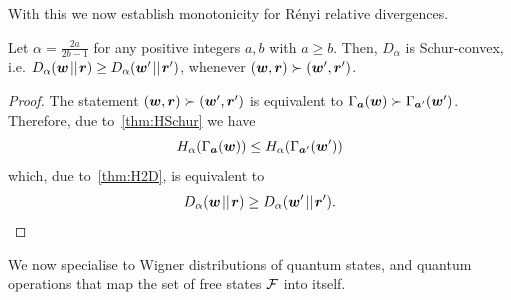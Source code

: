 \documentclass[pra,
aps,
twocolumn,
superscriptaddress,
groupedaddress,
nofootinbib,
reprint
]{revtex4-1}
\begin{document}
With this we now establish monotonicity for R\'{e}nyi relative divergences.
\begin{theorem}\label{thm:DSchur}
	Let $\alpha = \frac{2a}{2b-1}$ for any positive integers $a,b$ with $a \geq b$. 
	Then, $D_\alpha$ is Schur-convex, i.e. $D_\alpha(\boldsymbol{w} \hspace{1pt}||\hspace{1pt} \boldsymbol{r}) \geq D_\alpha(\boldsymbol{w}' \hspace{1pt}||\hspace{1pt} \boldsymbol{r}')$, whenever $(\boldsymbol{w}, \boldsymbol{r}) \succ (\boldsymbol{w}', \boldsymbol{r}')$.
\end{theorem}
\begin{proof}
	The statement $(\boldsymbol{w}, \boldsymbol{r}) \succ (\boldsymbol{w}', \boldsymbol{r}')$ is equivalent to $\Gamma_{\bm{a}}(\boldsymbol{w}) \succ \Gamma_{\bm{a}'}(\boldsymbol{w}')$.
	Therefore, due to~\cref{thm:HSchur} we have
	\begin{equation}
		H_\alpha(\Gamma_{\bm{a}}(\boldsymbol{w})) \leq H_\alpha(\Gamma_{\bm{a}'}(\boldsymbol{w}'))
	\end{equation}
	which, due to~\cref{thm:H2D}, is equivalent to
	\begin{equation}
		D_\alpha(\boldsymbol{w} \hspace{1pt}||\hspace{1pt} \boldsymbol{r}) \geq D_\alpha(\boldsymbol{w}' \hspace{1pt}||\hspace{1pt} \boldsymbol{r}').
	\end{equation}
\end{proof}
We now specialise to Wigner distributions of quantum states, and quantum operations that map the set of free states ${\mathcal F}$ into itself.
\begingroup
\def\thetheorem{\ref{thm:Da_props}}
\end{document}
